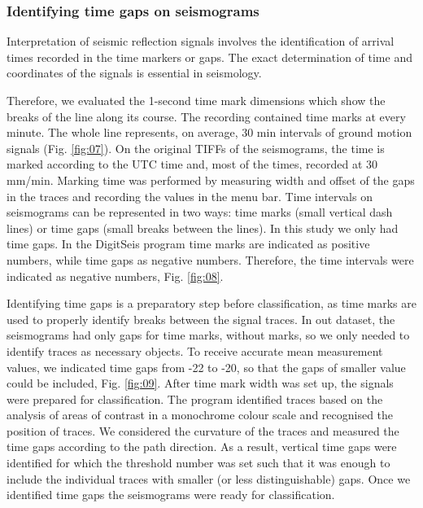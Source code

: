 \documentclass[informatics,article,submit,moreauthors,pdftex]{Definitions/mdpi}
\begin{document}
\subsubsection{Identifying time gaps on seismograms}
Interpretation of seismic reflection signals involves the identification of arrival times recorded in the time markers or gaps. The exact determination of time and coordinates of the signals is essential in seismology. 

Therefore, we evaluated the 1-second time mark dimensions which show the breaks of the line along its course. The recording contained time marks at every minute. The whole line represents, on average, 30 min intervals of ground motion signals (Fig. \ref{fig:07}). On the original TIFFs of the seismograms, the time is marked according to the \ac{UTC} time and, most of the times, recorded at 30 mm/min. Marking time was performed by measuring width and offset of the gaps in the traces and recording the values in the menu bar. Time intervals on seismograms can be represented in two ways: time marks (small vertical dash lines) or time gaps (small breaks between the lines). In this study we only had time gaps. In the DigitSeis program time marks are indicated as positive numbers, while time gaps as negative numbers. Therefore, the time intervals were indicated as negative numbers, Fig. \ref{fig:08}. 

Identifying time gaps is a preparatory step before classification, as time marks are used to properly identify breaks between the signal traces. In out dataset, the seismograms had only gaps for time marks, without marks, so we only needed to identify traces as necessary objects. To receive accurate mean measurement values, we indicated time gaps from -22 to -20, so that the gaps of smaller value could be included, Fig. \ref{fig:09}. After time mark width was set up, the signals were prepared for classification. The program identified traces based on the analysis of areas of contrast in a monochrome colour scale and recognised the position of traces. We considered the curvature of the traces and measured the time gaps according to the path direction. As a result, vertical time gaps were identified for which the threshold number was set such that it was enough to include the individual traces with smaller (or less distinguishable) gaps. Once we identified time gaps the seismograms were ready for classification. 
\end{document}
